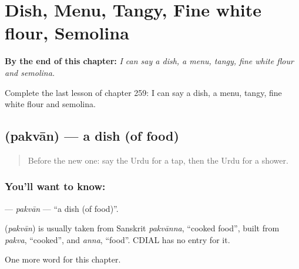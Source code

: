 
\chapter{Dish, Menu, Tangy, Fine white flour, Semolina}
\label{ch:ur-dish-menu-tangy-fine-white-flour-semolina}

\begin{chapteropening}
\textbf{By the end of this chapter:} \emph{I can say a dish, a menu, tangy, fine white flour and semolina.}

Complete the last lesson of chapter 259: I can say a dish, a menu, tangy, fine white flour and semolina.
\end{chapteropening}

\section[\texorpdfstring{\ur{پکوان} (pakvān)}{پکوان (pakvān)}]{ (pakvān) — a dish (of food)}

\label{lesson:UR-C259-pakvan}



\begin{quote}
Before the new one: say the Urdu for a tap, then the Urdu for a shower.
\end{quote}

\subsection*{You'll want to know: }
\textbf{} — \emph{pakvān} — \textquotedblleft{}a dish (of food)\textquotedblright{}.

\begin{cousinweb}
\textbf{} (\emph{pakvān}) is usually taken from Sanskrit \emph{pakvānna}, \textquotedblleft{}cooked food\textquotedblright{}, built from \emph{pakva}, \textquotedblleft{}cooked\textquotedblright{}, and \emph{anna}, \textquotedblleft{}food\textquotedblright{}. CDIAL has no entry for it.
\end{cousinweb}

\begin{grammarlens}[title={What you've built}]
One more word for this chapter.
\end{grammarlens}

